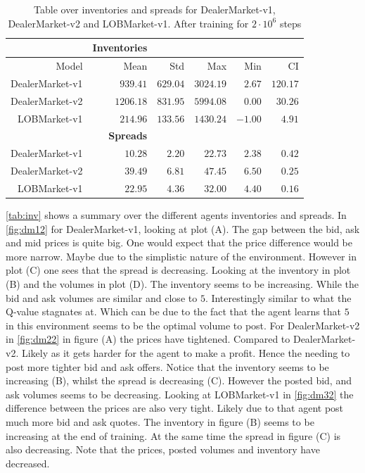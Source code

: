 \documentclass{kththesis}
\theoremstyle{definition}
\begin{document}
\begin{table}[H]
\centering
\begin{tabular}{rrrrrr}
\hline
 & \textbf{Inventories} \\
  \hline
 Model & Mean & Std & Max & Min & CI \\ 
  \hline
DealerMarket-v1& $939.41$ & $629.04$ & $3024.19$ & $2.67$ & $120.17$  \\
DealerMarket-v2 & $1206.18$ & $831.95$ & $5994.08$ & $0.00$ & $30.26$ \\ 
LOBMarket-v1 & $214.96$ & $133.56$ & $1430.24$ & $-1.00$ & $4.91$ \\ 
   \hline
    & \textbf{Spreads} \\
  \hline
DealerMarket-v1 & $10.28$ & $2.20$ & $22.73$ & $2.38$ & $0.42$ \\
DealerMarket-v2 & $39.49$ & $6.81$ & $47.45$ & $6.50$ & $0.25$ \\ 
LOBMarket-v1  & $22.95$ & $4.36$ & $32.00$ & $4.40$ & $0.16$ \\ 
\hline
\end{tabular}
\caption{Table over inventories and spreads for DealerMarket-v1, DealerMarket-v2 and LOBMarket-v1. After training for $2\cdot10^6$ steps}
\label{tab:inv}
\end{table}
\autoref{tab:inv} shows a summary over the different agents inventories and spreads. In \autoref{fig:dm12} for DealerMarket-v1, looking at plot (A). The gap between the bid, ask and mid prices is quite big. One would expect that the price difference would be more narrow. Maybe due to the simplistic nature of the environment. However in plot (C) one sees that the spread is decreasing. Looking at the inventory in plot (B) and the volumes in plot (D). The inventory seems to be increasing. While the bid and ask volumes are similar and close to $5$. Interestingly similar to what the Q-value stagnates at. Which can be due to the fact that the agent learns that $5$ in this environment seems to be the optimal volume to post.
\newline
\newline
For DealerMarket-v2 in \autoref{fig:dm22} in figure (A) the prices have tightened. Compared to DealerMarket-v2. Likely as it gets harder for the agent to make a profit. Hence the needing to post more tighter bid and ask offers. Notice that the inventory seems to be increasing (B), whilst the spread is decreasing (C). However the posted bid, and ask volumes seems to be decreasing. Looking at LOBMarket-v1 in \autoref{fig:dm32} the difference between the prices are also very tight. Likely due to that agent post much more bid and ask quotes. The inventory in figure (B) seems to be increasing at the end of training. At the same time the spread in figure (C) is also decreasing. Note that the prices, posted volumes and inventory have decreased.
\end{document}
